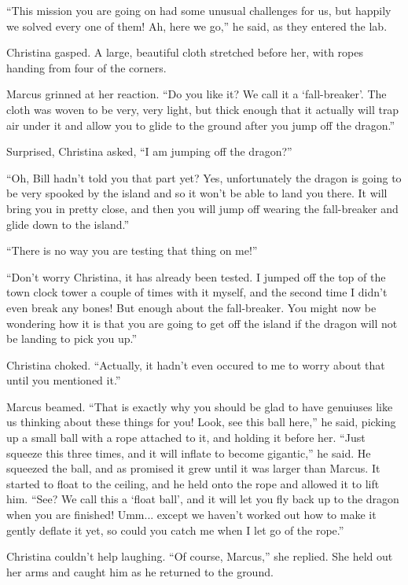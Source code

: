 \documentclass[showtrims,b6paper,draft,10pt]{memoir}
\begin{document}
``This mission you are going on had some unusual challenges for us, but happily we solved every one of them!  Ah, here we go,'' he said, as they entered the lab.

Christina gasped.  A large, beautiful cloth stretched before her, with ropes handing from four of the corners.

Marcus grinned at her reaction.  ``Do you like it?  We call it a `fall-breaker'.  The cloth was woven to be very, very light, but thick enough that it actually will trap air under it and allow you to glide to the ground after you jump off the dragon.''

Surprised, Christina asked,  ``I am jumping off the dragon?''

``Oh, Bill hadn't told you that part yet?  Yes, unfortunately the dragon is going to be very spooked by the island and so it won't be able to land you there.  It will bring you in pretty close, and then you will jump off wearing the fall-breaker and glide down to the island.''

``There is no way you are testing that thing on me!''

``Don't worry Christina, it has already been tested.  I jumped off the top of the town clock tower a couple of times with it myself, and the second time I didn't even break any bones!  But enough about the fall-breaker.  You might now be wondering how it is that you are going to get off the island if the dragon will not be landing to pick you up.''

Christina choked.  ``Actually, it hadn't even occured to me to worry about that until you mentioned it.''

Marcus beamed.  ``That is exactly why you should be glad to have genuiuses like us thinking about these things for you!  Look, see this ball here,'' he said, picking up a small ball with a rope attached to it, and holding it before her.  ``Just squeeze this three times, and it will inflate to become gigantic,'' he said.  He squeezed the ball, and as promised it grew until it was larger than Marcus.  It started to float to the ceiling, and he held onto the rope and allowed it to lift him.  ``See?  We call this a `float ball', and it will let you fly back up to the dragon when you are finished!  Umm... except we haven't worked out how to make it gently deflate it yet, so could you catch me when I let go of the rope.''

Christina couldn't help laughing.  ``Of course, Marcus,'' she replied.  She held out her arms and caught him as he returned to the ground.
\end{document}
